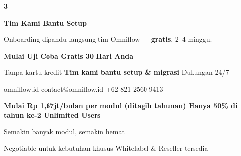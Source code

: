 \documentclass[a4paper]{article}
\begin{document}
\begin{center}
\begin{minipage}[t]{0.318\textwidth}
{\begin{minipage}[t][4.7cm][c]{\dimexpr\linewidth-2\fboxsep\relax}
            \begin{center}{\fontsize{22}{26}\selectfont\bfseries\color{BluePrimary} 3}\end{center}
            \vspace{2pt}
            \begin{center}
                {\fontsize{10}{13}\selectfont\bfseries\color{BlueDark} Tim Kami Bantu Setup}\par\vspace{3pt}
                {\fontsize{9}{12}\selectfont\color{TextDark} Onboarding dipandu langsung tim Omniflow --- \textbf{gratis}, 2--4 minggu.}
            \end{center}
        \end{minipage}}
\end{minipage}
\end{center}

\vspace{10pt}

{\setlength{\fboxsep}{10pt}\setlength{\fboxrule}{0pt}%
\noindent\colorbox{BluePrimary}{%
    \begin{minipage}{\dimexpr\textwidth-2\fboxsep\relax}
        \centering
        {\fontsize{13}{16}\selectfont\bfseries\color{White}
        Mulai Uji Coba Gratis 30 Hari Anda}\par\vspace{3pt}
        {\fontsize{9.5}{12}\selectfont\color{BlueMid}
        Tanpa kartu kredit \enspace\textbullet\enspace \textbf{Tim kami bantu setup \& migrasi} \enspace\textbullet\enspace Dukungan 24/7}\par\vspace{2pt}
        {\fontsize{9.5}{12}\selectfont\color{White}
        omniflow.id \enspace\textbullet\enspace contact@omniflow.id \enspace\textbullet\enspace +62 821 2560 9413}
    \end{minipage}}}

\vspace{6pt}

{\setlength{\fboxsep}{8pt}\setlength{\fboxrule}{0pt}%
\noindent\colorbox{BlueBg}{%
    \begin{minipage}{\dimexpr\textwidth-2\fboxsep\relax}
        \centering
        {\fontsize{9}{12}\selectfont\bfseries\color{BluePrimary}
        Mulai Rp 1,67jt/bulan per modul (ditagih tahunan) \enspace\textbullet\enspace Hanya 50\% di tahun ke-2 \enspace\textbullet\enspace Unlimited Users}\par\vspace{1pt}
        {\fontsize{8.5}{11}\selectfont\color{BlueDark}
        Semakin banyak modul, semakin hemat}\par\vspace{1pt}
        {\fontsize{8}{10}\selectfont\color{TextLight}
        Negotiable untuk kebutuhan khusus \enspace\textbullet\enspace Whitelabel \& Reseller tersedia}
    \end{minipage}}}
\end{document}
